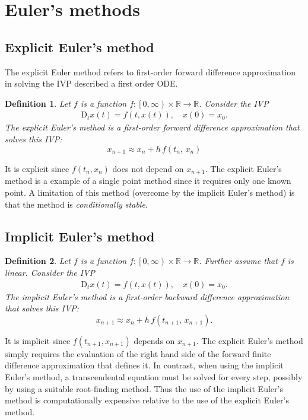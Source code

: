\documentclass[11pt]{article}
\newtheorem{definition}{Definition}
\begin{document}
\section*{Euler's methods}
\label{sec:orgea414bc}
\subsection*{Explicit Euler's method}
\label{sec:org1d22b20}
The explicit Euler method refers to first-order forward difference approximation in solving the IVP described a first order ODE.
\begin{definition}
Let \(f\) is a function \(f:\left[0, \infty\right) \times \mathbb{R} \rightarrow \mathbb{R}\). Consider the IVP
\begin{align*}
\mathrm{D}_t x(t) = f(t, x(t)), \quad x\left(0\right)=x_0.
\end{align*}
The explicit Euler's method is a first-order forward difference approximation that solves this IVP:
\[
x_{n+1} \approx x_{n} + h \, f(t_{n},\,x_{n})
\]
\label{orgfd82f57}
\end{definition}
It is explicit since \(f\left(t_n, x_n\right)\) does not depend on \(x_{n+1}\). The explicit Euler's method is a example of a single point method since it requires only one known point. A limitation of this method (overcome by the implicit Euler's method) is that the method is \emph{conditionally stable}.
\subsection*{Implicit Euler's method}
\label{sec:org952f43f}
\begin{definition}
Let \(f\) is a function \(f:\left[0, \infty\right) \times \mathbb{R} \rightarrow \mathbb{R}\). Further assume that \(f\) is linear. Consider the IVP
\begin{align*}
\mathrm{D}_t x(t) = f(t, x(t)), \quad x\left(0\right)=x_0.
\end{align*}
The implicit Euler's method is a first-order backward difference approximation that solves this IVP:
\[
x_{n+1} \approx x_{n} + h \, f(t_{n+1},\,x_{n+1}).
\]
\label{orgebbbe4e}
\end{definition}
It is implicit since \(f(t_{n+1}, x_{n+1})\) depends on \(x_{n+1}\).
The explicit Euler's method simply requires the evaluation of the right hand side of the forward finite difference approximation that defines it. In contrast, when using the implicit Euler's method, a transcendental equation must be solved for every step, possibly by using a suitable root-finding method. Thus the use of the implicit Euler's method is computationally expensive relative to the use of the explicit Euler's method.
\end{document}
